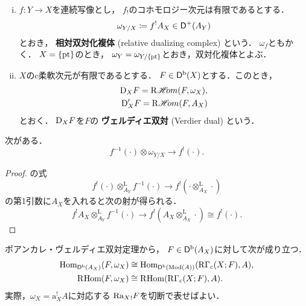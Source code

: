 \begin{comment}
\begin{CMT}
    最後から2行目の変形（順像と逆像の随伴の行）で
    \({\Rder\mathrm{a}_Y}_!G\)を考えている．
    これが\(\Domp^+(A_{\{\pt\}})\)に属すために，
    \(Y\)の次元に関する条件が要る．
\end{CMT}
\end{comment}
\begin{DFN}[{\cite[Definition 3.1.16]{KS90}}]
    \begin{enumerate}[(i)]
        \item \(f\colon Y\to X\)を連続写像とし，
        \(f_!\)のコホモロジー次元は有限であるとする．
        \[
            \omega_{Y/X}\coloneqq f^!A_X \in \mathsf{D}^+(A_Y)
        \]
        とおき，
        \textbf{相対双対化複体} (relative dualizing complex) という．
        \(\omega_f\)ともかく．
        \(X=\{\mathop{\mathrm{pt}}\nolimits\}\)のとき，
        \(\omega_Y=\omega_{Y/\{\mathop{\mathrm{pt}}\nolimits\}}\)とおき，双対化複体とよぶ．
        \item \(X\)のc柔軟次元が有限であるとする．
        \(F\in\mathsf{D}^{\mathrm{b}}(X)\)とする．このとき，
        \begin{align*}
            \mathrm{D}_XF=\mathop{\mathrm{R}\hspace{-1.5pt}\mathop{\mathscr{H}\hspace{-2pt}om}\nolimits}\nolimits(F,\omega_X), \\
            \mathrm{D}'_XF=\mathop{\mathrm{R}\hspace{-1.5pt}\mathop{\mathscr{H}\hspace{-2pt}om}\nolimits}\nolimits(F,A_X)
        \end{align*}
        とおく．
        \(\mathrm{D}_XF\)を\(F\)の
        \textbf{ヴェルディエ双対} (Verdier dual) という．
    \end{enumerate}
\end{DFN}

次がある．
\begin{equation}
    f^{-1}(\cdot)\otimes\omega_{Y/X}\to f^!(\cdot).\label{eq:VerdierDual}
\end{equation}
\begin{proof}
    \cite[Proposition 3.1.11]{KS90}の式
    \[
        f^!(\cdot)\otimes^\mathrm{L}_{A_Y}f^{-1}(\cdot)
        \to
        f^!\left(\cdot\otimes^\mathrm{L}_{A_X}\cdot\right)
    \]の第1引数に\(A_X\)を入れると次の射が得られる．
    \[
        f^!A_X\otimes^\mathrm{L}_{A_Y}f^{-1}(\cdot)
        \to
        f^!\left(A_X\otimes^\mathrm{L}_{A_X}\cdot\right)
        \cong f^!(\cdot).
    \]        
\end{proof}

ポアンカレ・ヴェルディエ双対定理から，
\(F\in\mathsf{D}^\mathrm{b}(A_X)\)に対して次が成り立つ．
\begin{align}
    \mathop{\mathrm{Hom}}\nolimits_{\mathsf{D}^\mathrm{b}(A_X)}(F,\omega_X)
    &\cong
    \mathop{\mathrm{Hom}}\nolimits_{\mathsf{D}^\mathrm{b}(\mathop{\mathrm{Mod}}\nolimits(A))}(\mathop{\mathrm{R}\hspace{-0pt}\Gamma}\nolimits_c(X;F),A),\\
    \mathop{\mathrm{R}\hspace{-1.5pt}\mathop{\mathrm{Hom}}\nolimits}\nolimits(F,\omega_X)
    &\cong
    \mathop{\mathrm{R}\hspace{-1.5pt}\mathop{\mathrm{Hom}}\nolimits}\nolimits(\mathop{\mathrm{R}\hspace{-0pt}\Gamma}\nolimits_c(X;F),A).\label{eq:RPV-dual}
\end{align}
実際，\(\omega_X=\mathrm{a}_X^!A\)に対応する
\({\mathrm{R}\mathrm{a}_X}_!F\)を切断で表せばよい．

